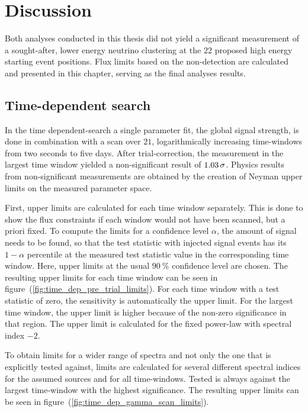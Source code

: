 \chapter{Discussion}

Both analyses conducted in this thesis did not yield a significant measurement of a sought-after, lower energy neutrino clustering at the $\num{22}$ proposed high energy starting event positions.
Flux limits based on the non-detection are calculated and presented in this chapter, serving as the final analyses results.

\section*{Time-dependent search}
In the time dependent-search a single parameter fit, the global signal strength, is done in combination with a scan over $\num{21}$, logarithmically increasing time-windows from two seconds to five days.
After trial-correction, the measurement in the largest time window yielded a non-significant result of $\num{1.03}\,\sigma$.
Physics results from non-significant measurements are obtained by the creation of Neyman upper limits on the measured parameter space.

First, upper limits are calculated for each time window separately.
This is done to show the flux constraints if each window would not have been scanned, but a priori fixed.
To compute the limits for a confidence level $\alpha$, the amount of signal needs to be found, so that the test statistic with injected signal events has its $1-\alpha$ percentile at the measured test statistic value in the corresponding time window.
Here, upper limits at the usual $\SI{90}{\percent}$ confidence level are chosen.
The resulting upper limits for each time window can be seen in figure~(\ref{fig:time_dep_pre_trial_limits}).
For each time window with a test statistic of zero, the sensitivity is automatically the upper limit.
For the largest time window, the upper limit is higher because of the non-zero significance in that region.
The upper limit is calculated for the fixed power-law with spectral index $-2$.

To obtain limits for a wider range of spectra and not only the one that is explicitly tested against, limits are calculated for several different spectral indices for the assumed sources and for all time-windows.
Tested is always against the largest time-window with the highest significance.
The resulting upper limits can be seen in figure~(\ref{fig:time_dep_gamma_scan_limits}).

